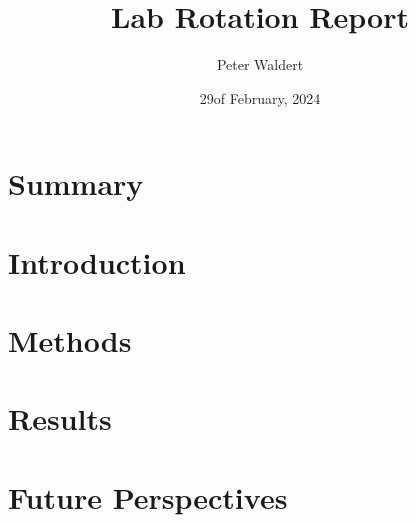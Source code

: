 \documentclass[12pt]{article}
\title{Lab Rotation Report}
\author{Peter Waldert}
\date{29\th of February, 2024}
\begin{document}
  \maketitle

  \section{Summary}
  \section{Introduction}
  \section{Methods}
  \section{Results}
  \section{Future Perspectives}
\end{document}
